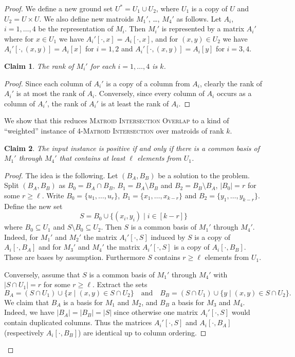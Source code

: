 \documentclass[10pt,a4paper]{article}
\newenvironment{subproof}{\begin{proof}[Proof]}{\end{proof}}
\newtheorem{claim}{Claim}[section]
\begin{document}
\begin{proof}
  We define a new ground set $U^*=U_1 \cup U_2$, where
  $U_1$ is a copy of $U$ and $U_2=U \times U$.
  We also define new matroids $M_1'$, \ldots, $M_4'$ as follows.
  Let $A_i$, $i=1, \ldots, 4$ be the representation of $M_i$.
  Then $M_i'$ is represented by a matrix $A_i'$ where
  for $x \in U_1$ we have $A_i'[\cdot,x]=A_i[\cdot,x]$,
  and for $(x,y) \in U_2$ we have
  $A_i'[\cdot,(x,y)]=A_i[x]$ for $i=1, 2$ and
  $A_i'[\cdot,(x,y)]=A_i[y]$ for $i=3,4$.
  
  \begin{claim}
    The rank of $M_i'$ for each $i=1, \ldots, 4$ is $k$.
  \end{claim}
  \begin{subproof}
    Since each column of $A_i'$ is a copy of a column from $A_i$,
    clearly the rank of $A_i'$ is at most the rank of $A_i$.
    Conversely, since every column of $A_i$ occurs as a column of $A_i'$,
    the rank of $A_i'$ is at least the rank of $A_i$. 
  \end{subproof}
  
  We show that this reduces \textsc{Matroid Intersection Overlap}
  to a kind of ``weighted'' instance of \textsc{4-Matroid Intersection}
  over matroids of rank $k$.
  
  \begin{claim}
    The input instance is positive if and only if there is a common
    basis of $M_1'$ through $M_4'$ that contains at least $\ell$
    elements from $U_1$. 
  \end{claim}
  \begin{subproof}
    The idea is the following. Let $(B_A, B_B)$ be a solution to the problem.
    Split $(B_A, B_B)$ as $B_0=B_A \cap B_B$, $B_1 = B_A \setminus B_B$
    and $B_2=B_B \setminus B_A$, $|B_0|=r$ for some $r \geq \ell$.
    Write $B_0=\{u_1,\ldots,u_r\}$, 
    $B_1=\{x_1,\ldots,x_{k-r}\}$ and $B_2=\{y_1,\ldots,y_{k-r}\}$.
    Define the new set
    \[
      S=B_0 \cup \{(x_i,y_i) \mid i \in [k-r]\}
    \]
    where $B_0 \subseteq U_1$ and $S \setminus B_0 \subseteq U_2$. 
    Then $S$ is a common basis of $M_1'$ through $M_4'$. 
    Indeed, for $M_1'$ and $M_2'$ the matrix
    $A_i'[\cdot,S]$ induced by $S$ is a copy of $A_i[\cdot,B_A]$
    and for $M_3'$ and $M_4'$ the matrix
    $A_i'[\cdot,S]$ is a copy of $A_i[\cdot,B_B]$.
    These are bases by assumption. Furthermore $S$ contains
    $r \geq \ell$ elements from $U_1$.

    Conversely, assume that $S$ is a common basis of $M_1'$ through
    $M_4'$ with $|S \cap U_1|=r$ for some $r \geq \ell$.
    Extract the sets
    \[
      B_A = (S \cap U_1) \cup \{x \mid (x,y) \in S \cap U_2\}
      \quad \text{and} \quad
      B_B = (S \cap U_1) \cup \{y \mid (x,y) \in S \cap U_2\}.
    \]
    We claim that $B_A$ is a basis for $M_1$ and $M_2$,
    and $B_B$ a basis for $M_3$ and $M_4$. Indeed, we have
    $|B_A|=|B_B|=|S|$ since otherwise one matrix $A_i'[\cdot,S]$
    would contain duplicated columns. 
    Thus the matrices $A_i'[\cdot,S]$
    and $A_i[\cdot,B_A]$ (respectively $A_i[\cdot,B_B]$)
    are identical up to column ordering.
  \end{subproof}
  

\end{proof}
\end{document}
